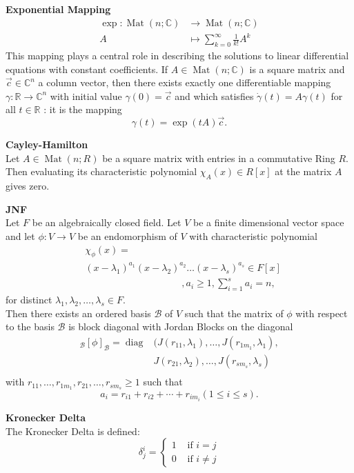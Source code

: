 \documentclass[a4paper, 10pt]{article}
\begin{document}
\begin{multicols*}{3}
\textbf{Exponential Mapping}\\
$$
\begin{aligned}
\exp : \operatorname{Mat}(n ; \mathbb{C}) & \rightarrow \operatorname{Mat}(n ; \mathbb{C}) \\
A & \mapsto \sum_{k=0}^{\infty} \frac{1}{k !} A^k
\end{aligned}
$$
This mapping plays a central role in describing the solutions to linear differential equations with constant coefficients. 
If $A \in \operatorname{Mat}(n ; \mathbb{C})$ is a square matrix and $\vec{c} \in \mathbb{C}^n$ a column vector, then there exists exactly one differentiable mapping $\gamma: \mathbb{R} \rightarrow \mathbb{C}^n$ with initial value $\gamma(0)=\vec{c}$ and which satisfies $\dot{\gamma}(t)=A \gamma(t)$ for all $t \in \mathbb{R}$ : it is the mapping
$$
\gamma(t)=\exp (t A) \vec{c} .
$$

\textbf{Cayley-Hamilton}\\
Let $A \in \operatorname{Mat}(n ; R)$ be a square matrix with entries in a commutative Ring $R$. Then evaluating its characteristic polynomial $\chi_A(x) \in R[x]$ at the matrix $A$ gives zero.

\textbf{JNF}\\
Let $F$ be an algebraically closed field. Let $V$ be a finite dimensional vector space and let $\phi: V \rightarrow V$ be an endomorphism of $V$ with characteristic polynomial
$$
\begin{aligned}
&\chi_\phi(x)=\\
&\left(x-\lambda_1\right)^{a_1}\left(x-\lambda_2\right)^{a_2} \ldots\left(x-\lambda_s\right)^{a_s} \in F[x]\\
&\qquad\qquad\qquad\qquad\qquad, a_i \geqslant 1, \sum_{i=1}^s a_i=n,
\end{aligned}
$$
for distinct $\lambda_1, \lambda_2, \ldots, \lambda_s \in F$. \\
Then there exists an ordered basis $\mathcal{B}$ of $V$ such that the matrix of $\phi$ with respect to the basis $\mathcal{B}$ is block diagonal with Jordan Blocks on the diagonal
$$
\begin{aligned}
{ }_{\mathcal{B}}[\phi]_{\mathcal{B}}=\operatorname{diag} & (J(r_{11}, \lambda_1), \ldots, J(r_{1 m_1}, \lambda_1), \\
&J(r_{21}, \lambda_2), \ldots, J(r_{s m_s}, \lambda_s)\\
\end{aligned}
$$
with $r_{11}, \ldots, r_{1 m_1}, r_{21}, \ldots, r_{s m_s} \geqslant 1$ such that
$$
a_i=r_{i 1}+r_{i 2}+\cdots+r_{i m_i}(1 \leqslant i \leqslant s) .
$$

\textbf{Kronecker Delta}\\
The Kronecker Delta is defined:$$\delta_j^i= \begin{cases}1 & \text { if } i=j \\ 0 & \text { if } i \neq j\end{cases}$$

\end{multicols*}
\end{document}
